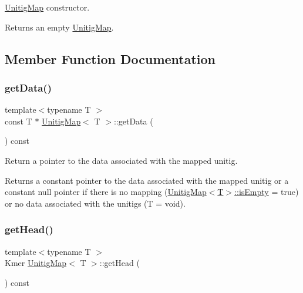 \hyperlink{structUnitigMap}{Unitig\+Map} constructor. 

\begin{DoxyReturn}{Returns}
an empty \hyperlink{structUnitigMap}{Unitig\+Map}. 
\end{DoxyReturn}


\subsection{Member Function Documentation}
\mbox{\label{structUnitigMap_a35643b0843f2b0ff5da8c2a40612c8fc}} 
\subsubsection{\texorpdfstring{get\+Data()}{getData()}}
{\footnotesize\ttfamily template$<$typename T $>$ \\
const T $\ast$ \hyperlink{structUnitigMap}{Unitig\+Map}$<$ T $>$\+::get\+Data (\begin{DoxyParamCaption}{ }\end{DoxyParamCaption}) const}



Return a pointer to the data associated with the mapped unitig. 

\begin{DoxyReturn}{Returns}
a constant pointer to the data associated with the mapped unitig or a constant null pointer if there is no mapping (\hyperlink{structUnitigMap_a152c942911cb2ccf57d4c4c1e3f40178}{Unitig\+Map$<$\+T$>$\+::is\+Empty} = true) or no data associated with the unitigs (T = void). 
\end{DoxyReturn}
\mbox{\label{structUnitigMap_a0abb8766ed68fdade6aa6d9d5ea201f3}} 
\subsubsection{\texorpdfstring{get\+Head()}{getHead()}}
{\footnotesize\ttfamily template$<$typename T $>$ \\
Kmer \hyperlink{structUnitigMap}{Unitig\+Map}$<$ T $>$\+::get\+Head (\begin{DoxyParamCaption}{ }\end{DoxyParamCaption}) const}



